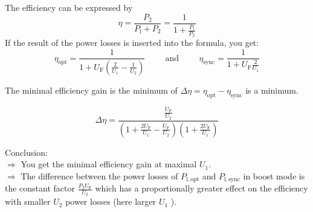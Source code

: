 \begin{solutionblock}
    The efficiency can be expressed by 
    \begin{equation}
        \eta = \frac{P_\mathrm{2}}{P_\mathrm{l}+P_\mathrm{2}}=\frac{1}{1+\frac{P_\mathrm{l}}{P_\mathrm{2}}}
    \end{equation}
    If the result of the power losses is inserted into the formula, you get:
    \begin{equation}
        \eta_\mathrm{opt} = \frac{1}{1+U_\mathrm{F} \left(\frac{2}{U_\mathrm{1}}-\frac{1}{U_\mathrm{2}}\right)}
        \hspace{1cm} \mathrm{and} \hspace{1cm}
        \eta_\mathrm{sync} = \frac{1}{1+U_\mathrm{F} \frac{2}{U_\mathrm{1}}}
    \end{equation}

    The minimal efficiency gain is the minimum of $\Delta \eta=\eta_\mathrm{opt}-\eta_\mathrm{sync}$ is a minimum.
    
    \begin{equation}
        \Delta \eta= \frac{\frac{U_\mathrm{F}}{U_\mathrm{2}}}{\left(1+ \frac{2 U_\mathrm{F}}{U_\mathrm{1}}-\frac{U_\mathrm{F}}{U_\mathrm{2}} \right) \left(1+\frac{2 U_\mathrm{F}}{U_\mathrm{1}}\right)}
    \end{equation}

    Conclusion: \\
    $\Rightarrow$ You get the minimal efficiency gain at maximal $U_\mathrm{1}$. \\
    $\Rightarrow$ The difference between the power losses of $P_\mathrm{l,opt}$ and $P_\mathrm{l,sync}$ in boost mode is the constant factor 
    $\frac{P_\mathrm{2} U_\mathrm{F}}{U_\mathrm{2}}$
    which has a proportionally greater effect on the efficiency with smaller $U_\mathrm{2}$ power losses (here larger $U_\mathrm{1}$ ).

\end{solutionblock}